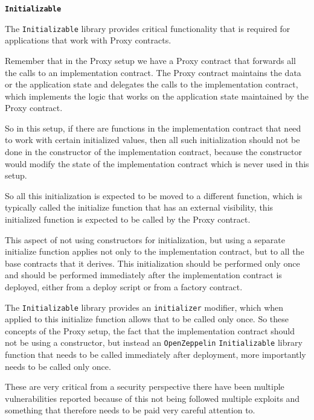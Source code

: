 \textbf{\texttt{Initializable}}

The \texttt{Initializable} library provides critical functionality that
is required for applications that work with Proxy contracts.

Remember that in the Proxy setup we have a Proxy contract that forwards
all the calls to an implementation contract. The Proxy contract
maintains the data or the application state and delegates the calls to
the implementation contract, which implements the logic that works on
the application state maintained by the Proxy contract.

So in this setup, if there are functions in the implementation contract
that need to work with certain initialized values, then all such
initialization should not be done in the constructor of the
implementation contract, because the constructor would modify the state
of the implementation contract which is never used in this setup.

So all this initialization is expected to be moved to a different
function, which is typically called the initialize function that has an
external visibility, this initialized function is expected to be called
by the Proxy contract.

This aspect of not using constructors for initialization, but using a
separate initialize function applies not only to the implementation
contract, but to all the base contracts that it derives. This
initialization should be performed only once and should be performed
immediately after the implementation contract is deployed, either from a
deploy script or from a factory contract.

The \texttt{Initializable} library provides an \texttt{initializer}
modifier, which when applied to this initialize function allows that to
be called only once. So these concepts of the Proxy setup, the fact that
the implementation contract should not be using a constructor, but
instead an \texttt{OpenZeppelin} \texttt{Initializable} library function
that needs to be called immediately after deployment, more importantly
needs to be called only once.

These are very critical from a security perspective there have been
multiple vulnerabilities reported because of this not being followed
multiple exploits and something that therefore needs to be paid very
careful attention to.
